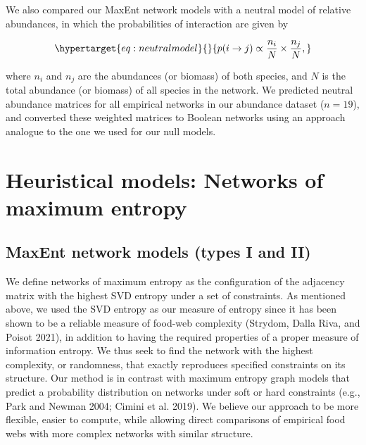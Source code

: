 \documentclass[11pt]{article}
\begin{document}
We also compared our MaxEnt network models with a neutral model of
relative abundances, in which the probabilities of interaction are given
by

\begin{equation}\protect\hypertarget{eq:neutralmodel}{}{p(i \rightarrow j) \propto \frac{n_i}{N} \times \frac{n_j}{N},}\label{eq:neutralmodel}\end{equation}

where \(n_i\) and \(n_j\) are the abundances (or biomass) of both
species, and \(N\) is the total abundance (or biomass) of all species in
the network. We predicted neutral abundance matrices for all empirical
networks in our abundance dataset (\(n = 19\)), and converted these
weighted matrices to Boolean networks using an approach analogue to the
one we used for our null models.

\hypertarget{heuristical-models-networks-of-maximum-entropy}{%
\section{Heuristical models: Networks of maximum
entropy}\label{heuristical-models-networks-of-maximum-entropy}}

\hypertarget{maxent-network-models-types-i-and-ii}{%
\subsection{MaxEnt network models (types I and
II)}\label{maxent-network-models-types-i-and-ii}}

We define networks of maximum entropy as the configuration of the
adjacency matrix with the highest SVD entropy under a set of
constraints. As mentioned above, we used the SVD entropy as our measure
of entropy since it has been shown to be a reliable measure of food-web
complexity (Strydom, Dalla Riva, and Poisot 2021), in addition to having
the required properties of a proper measure of information entropy. We
thus seek to find the network with the highest complexity, or
randomness, that exactly reproduces specified constraints on its
structure. Our method is in contrast with maximum entropy graph models
that predict a probability distribution on networks under soft or hard
constraints (e.g., Park and Newman 2004; Cimini et al. 2019). We believe
our approach to be more flexible, easier to compute, while allowing
direct comparisons of empirical food webs with more complex networks
with similar structure.
\end{document}
